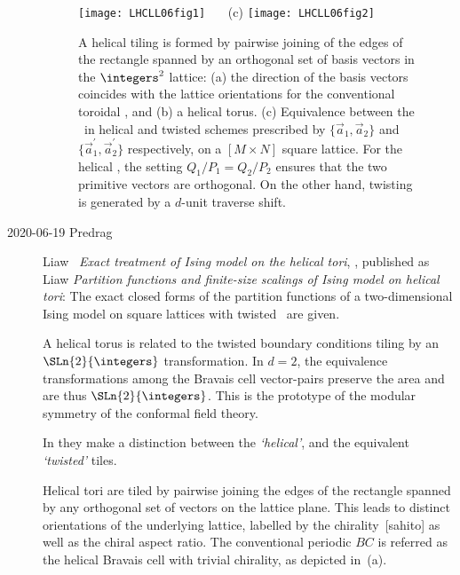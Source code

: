 \begin{description}
\begin{figure}
  \centering
\texttt{[image: LHCLL06fig1]}
~~~(c) \texttt{[image: LHCLL06fig2]}
  \caption{\label{LHCLL06fig1}
A helical tiling is formed by pairwise joining of the edges of the
rectangle spanned by an orthogonal set of basis vectors in the
$\integers^2$ lattice:
(a)
    the direction of the basis vectors coincides with the lattice
    orientations for the conventional toroidal \bcs, and
(b)
    a helical torus.
(c)
    Equivalence between the \bcs\ in helical and twisted schemes
    prescribed by $\{{\vec{a}}_{1},{\vec{a}}_{2}\}$ and
    $\{{\vec{a}}_{1}^{\prime},{\vec{a}}_{2}^{\prime }\}$ respectively, on
    a $[M\times N]$ square lattice. For the helical \bcs, the setting
    $Q_{1}/P_{1}=Q_{2}/P_{2}$ ensures that the two primitive vectors are
    orthogonal. On the other hand, twisting is generated by a $d$-unit
    traverse shift.
        }
\end{figure}

\item[2020-06-19 Predrag]
Liaw \etal\ {\em Exact treatment of Ising model on the helical tori},
, published as
%
Liaw \etal{} {\em Partition functions and finite-size scalings
of {Ising} model on helical tori}:
The exact closed forms of the partition functions of a two-dimensional
Ising model on square lattices with twisted \bcs\ are given.

A helical
torus is related to the twisted boundary conditions tiling by an
$\SLn{2}{\integers}$ transformation. In $d=2$, the equivalence
transformations among the Bravais cell vector-pairs preserve
the area and are thus $\SLn{2}{\integers}$. This is the prototype of the
modular symmetry of the conformal field theory.%

In  they make a distinction between
the \emph{`helical'}, and the equivalent \emph{`twisted'} tiles.

Helical tori are tiled by pairwise joining the edges of the
rectangle spanned by any orthogonal set of vectors on the lattice plane.
This leads to distinct orientations of the underlying lattice, labelled
by the chirality~{[sahito]} as well as the chiral aspect ratio. The
conventional periodic $BC$ is referred as the helical Bravais cell with trivial
chirality, as depicted in \,(a).


\end{description}
